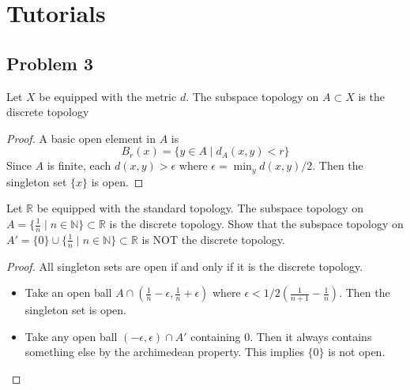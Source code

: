 \documentclass[12pt]{article}
\begin{document}
\section{Tutorials}
\subsection{Problem 3}
Let $X$ be equipped with the metric $d$.
The subspace topology on $A \subset X$ is
the discrete topology
\begin{proof}
    A basic open element in $A$ is 
    $$B_{r}(x) = \{y \in A \mid d_A(x, y) < r\}$$
    Since $A$ is finite, each $d(x, y) > \epsilon$
    where $\epsilon = \min_y d(x, y) / 2$.
    Then the singleton set $\{x\}$ is open.
\end{proof}

Let $\mathbb{R}$ be equipped with the standard
topology. The subspace topology on 
$A = \{\frac{1}{n} \mid n \in \mathbb{N}\} \subset \mathbb{R}$
is the discrete topology. Show that the subspace topology on 
$A' = \{0\} \cup \{\frac{1}{n} \mid n \in \mathbb{N}\} \subset \mathbb{R}$
is NOT the discrete topology.
\begin{proof}
    All singleton sets are open if and only if it is the discrete topology.
    \begin{itemize}
        \item Take an open ball $A \cap (\frac{1}{n} - \epsilon, \frac{1}{n} + \epsilon)$
        where $\epsilon < 1/2 (\frac{1}{n+1} - \frac{1}{n})$. 
        Then the singleton set is open.
        \item Take any open ball $(-\epsilon, \epsilon) \cap A'$ containing 0.
        Then it always contains something else by the archimedean property.
        This implies $\{0\}$ is not open.
    \end{itemize}
\end{proof}
\end{document}
